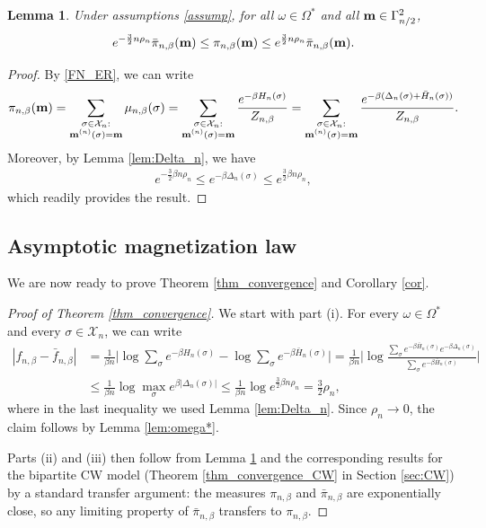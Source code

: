 \documentclass[11pt,oneside]{amsart}
\numberwithin{equation}{section}  %
\theoremstyle{plain}
\newtheorem{lemma}[theorem]{Lemma}
\theoremstyle{remark}
\def \bm {{\bf m}}
\begin{document}
\begin{lemma}\label{lem:FN_FNCW}
Under assumptions \eqref{assump}, for all $\omega \in \Omega^*$ and all $\bm \in \Gamma_{n/2}^2$,
\[
    e^{-\frac{3}{2}n \rho_n} \bar{\pi}_{n,\beta}(\bm)\leq \pi_{n,\beta} (\bm)\leq e^{\frac{3}{2}n \rho_n} \bar{\pi}_{n,\beta} (\bm).
\]
\end{lemma}
\begin{proof}
By \eqref{FN_ER}, we can write
   \begin{align*}
       \pi_{n,\beta}(\bm)=\sum_{\substack{\sigma \in \mathcal{X}_n: \\ \bm^{(n)}(\sigma)=\bm}} \mu_{n,\beta}(\sigma)=
       \sum_{\substack{\sigma \in \mathcal{X}_n: \\ \bm^{(n)}(\sigma)=\bm}} \frac{e^{-\beta H_n(\sigma)}}{Z_{n,\beta}}=
       \sum_{\substack{\sigma \in \mathcal{X}_n: \\ \bm^{(n)}(\sigma)=\bm}} \frac{e^{-\beta (\Delta_n(\sigma)+\bar{H}_n(\sigma))}}{Z_{n,\beta}}.
   \end{align*}
Moreover, by Lemma \ref{lem:Delta_n}, we have
    \begin{align*}
    e^{- \frac{3}{2}\beta n \rho_n} \leq e^{-\beta \Delta_n(\sigma)} \leq e^{ \frac{3}{2}\beta n\rho_n},
\end{align*}
which readily provides the result.
\end{proof}




\subsection{Asymptotic magnetization law}\label{subsec:convergence_mag}

We are now ready to prove Theorem \ref{thm_convergence} and Corollary \ref{cor}.

\begin{proof}[Proof of Theorem \ref{thm_convergence}]
We start with part (i). For every $\omega \in \Omega^*$ and every $\sigma \in \mathcal{X}_n$, we can write
\begin{align*}
|f_{n,\beta} - \bar{f}_{n,\beta}|
&= \frac{1}{\beta n} \Bigg| \log \sum_{\sigma} e^{-\beta H_n(\sigma)} - \log \sum_{\sigma} e^{-\beta \bar{H}_n(\sigma)} \Bigg| = \frac{1}{\beta n} \Bigg| \log \frac{\sum_{\sigma} e^{-\beta \bar{H}_n(\sigma)} e^{-\beta \Delta_n(\sigma)}}{\sum_{\sigma} e^{-\beta \bar{H}_n(\sigma)}} \Bigg| \\
&\le \frac{1}{\beta n} \log \max_{\sigma} e^{\beta |\Delta_n(\sigma)|} \le \frac{1}{\beta n} \log e^{\frac{3}{2}\beta n \rho_n} =  \frac{3}{2}\rho_n,
\end{align*}
where in the last inequality we used Lemma \ref{lem:Delta_n}. Since $\rho_n \to 0$, the claim follows by Lemma \ref{lem:omega*}.

Parts (ii) and (iii) then follow from Lemma \ref{lem:FN_FNCW} and the corresponding results for the bipartite CW model (Theorem \ref{thm_convergence_CW} in Section \ref{sec:CW}) by a standard transfer argument: the measures $\pi_{n,\beta}$ and $\bar{\pi}_{n,\beta}$ are exponentially close, so any limiting property of $\bar{\pi}_{n,\beta}$ transfers to $\pi_{n,\beta}$.
\end{proof}
\end{document}
